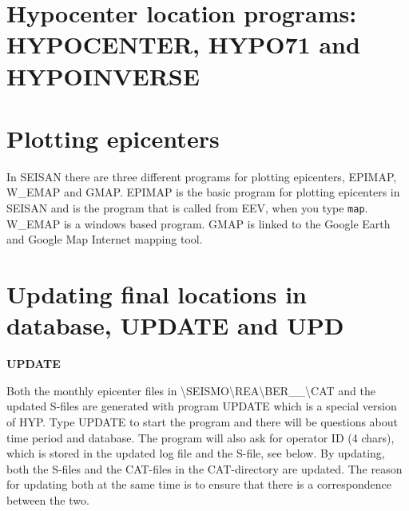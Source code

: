 \section{Hypocenter location programs: HYPOCENTER, HYPO71 and HYPOINVERSE}
\label{sect:hypocenter}








\section{Plotting epicenters} 
In SEISAN there are three different programs for plotting epicenters, 
EPIMAP, W\_EMAP and GMAP. 
EPIMAP is the basic program for plotting epicenters in SEISAN and 
is the program that is called from EEV, when you type \texttt{map}.
W\_EMAP is a windows based program.  
GMAP is linked to the Google Earth and Google Map Internet mapping tool.















\section{Updating final locations in database, UPDATE and UPD} 
\label{sect:update-upd}

\textbf{UPDATE}

Both the 
monthly epicenter files in 
\textbackslash SEISMO\textbackslash REA\textbackslash BER\_\_\textbackslash CAT 
and the updated S-files are generated with program 
UPDATE which is a special version of HYP. Type UPDATE to start the 
program and there will be questions about time period and database. 
The program will also ask for operator ID (4 chars), 
which is stored in the updated log file and the S-file, see below. \newline
By updating, both the S-files and the CAT-files in the CAT-directory 
are updated. The reason for updating both at the same time is to ensure 
that there is a correspondence between the two.  

